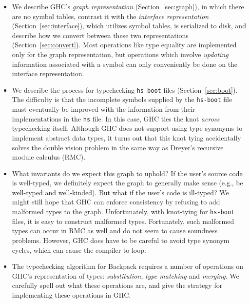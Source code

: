 \begin{itemize}
    \item We describe GHC's \emph{graph representation} (Section~\ref{sec:graph}), in
    which there are no symbol tables, contrast it with
    the \emph{interface representation} (Section~\ref{sec:interface}), which utilizes symbol
    tables, is serialized to disk, and describe how we convert
    between these two representations (Section~\ref{sec:convert}).  Most operations like type
    equality are implemented only for the graph representation, but
    operations which involve \emph{updating} information associated with
    a symbol can only conveniently be done on the interface
    representation.

    \item We describe the process for typechecking
    \verb|hs-boot| files (Section~\ref{sec:boot}). The
    difficulty is that the incomplete symbols supplied
    by the \verb|hs-boot| file must eventually be improved
    with the information from their implementations in the
    \verb|hs| file.  In this case, GHC ties the knot \emph{across}
    typechecking itself.  Although GHC does not support
    using type synonyms to implement abstract data types, it turns out that
    this knot tying accidentally solves the double vision
    problem in the same way as Dreyer's recursive module
    calculus (RMC).

    \item What invariants do we expect this graph to uphold?
    If the user's source code is well-typed, we definitely expect
    the graph to generally make sense (e.g., be well-typed and
    well-kinded).  But what if the user's code is ill-typed?  We
    might still hope that GHC can enforce consistency by refusing
    to add malformed types to the graph.  Unfortunately, with
    knot-tying for \verb|hs-boot| files, it is easy to construct
    malformed types.  Fortunately, such malformed types can occur in RMC
    as well and do not seem to cause soundness problems.  However, GHC
    does have to be careful to avoid type synonym cycles, which can
    cause the compiler to loop.

    \item The typechecking algorithm for Backpack requires
    a number of operations on GHC's representation of types:
    \emph{substitution}, \emph{type matching} and \emph{merging}.
    We carefully spell out what these operations are, and give
    the strategy for implementing these operations in GHC\@.
\end{itemize}

